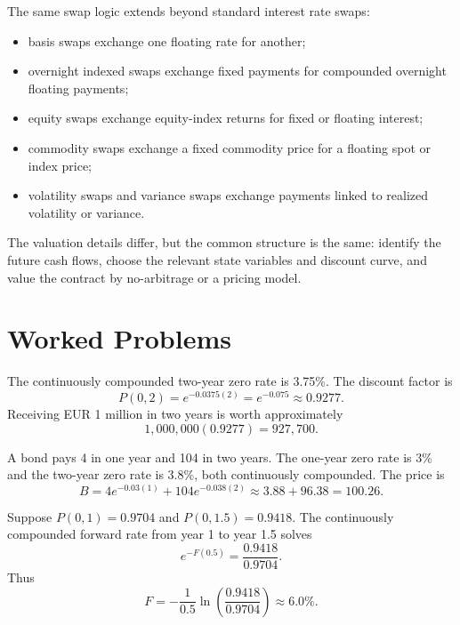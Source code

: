 The same swap logic extends beyond standard interest rate swaps:
\begin{itemize}
    \item basis swaps exchange one floating rate for another;
    \item overnight indexed swaps exchange fixed payments for compounded
    overnight floating payments;
    \item equity swaps exchange equity-index returns for fixed or floating
    interest;
    \item commodity swaps exchange a fixed commodity price for a floating spot
    or index price;
    \item volatility swaps and variance swaps exchange payments linked to
    realized volatility or variance.
\end{itemize}

The valuation details differ, but the common structure is the same: identify
the future cash flows, choose the relevant state variables and discount curve,
and value the contract by no-arbitrage or a pricing model.

\section{Worked Problems}

\begin{exmp}
The continuously compounded two-year zero rate is 3.75\%. The discount factor
is
\[
    P(0,2)=e^{-0.0375(2)}=e^{-0.075}\approx 0.9277.
\]
Receiving EUR 1 million in two years is worth approximately
\[
    1{,}000{,}000(0.9277)=927{,}700.
\]
\end{exmp}

\begin{exmp}
A bond pays 4 in one year and 104 in two years. The one-year zero rate is
3\% and the two-year zero rate is 3.8\%, both continuously compounded. The
price is
\[
    B=4e^{-0.03(1)}+104e^{-0.038(2)}
    \approx 3.88+96.38=100.26.
\]
\end{exmp}

\begin{exmp}
Suppose $P(0,1)=0.9704$ and $P(0,1.5)=0.9418$. The continuously compounded
forward rate from year 1 to year 1.5 solves
\[
    e^{-F(0.5)}=\frac{0.9418}{0.9704}.
\]
Thus
\[
    F=-\frac{1}{0.5}\ln\left(\frac{0.9418}{0.9704}\right)
    \approx 6.0\%.
\]
\end{exmp}

